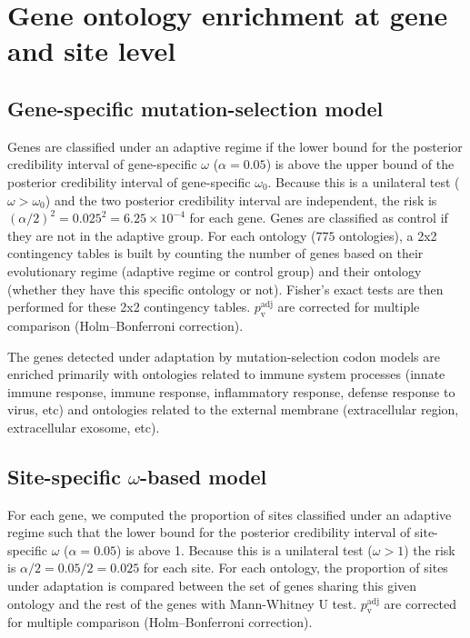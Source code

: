 \documentclass{article}
\renewcommand*{\bm}[1]{#1}%
\begin{document}
    \newpage


    \section{Gene ontology enrichment at gene and site level}
    \label{sec:gene-ontology-enrichment}

    \subsection{Gene-specific mutation-selection model}

    Genes are classified under an adaptive regime if the lower bound for the posterior credibility interval of gene-specific $\omega$ ($\alpha=0.05$) is above the upper bound of the posterior credibility interval of gene-specific $\omega_{0}$.
    Because this is a unilateral test ($\omega > \omega_{0}$) and the two posterior credibility interval are independent, the risk is $(\alpha/2)^2=0.025^2=6.25 \times 10^{-4}$ for each gene.
    Genes are classified as control if they are not in the adaptive group.
    For each ontology ($775$ ontologies), a 2x2 contingency tables is built by counting the number of genes based on their evolutionary regime (adaptive regime or control group) and their ontology (whether they have this specific ontology or not).
    Fisher's exact tests are then performed for these 2x2 contingency tables.
    $p_{\mathrm{v}}^{\mathrm{adj}}$ are corrected for multiple comparison (Holm–Bonferroni correction).

    \begin{center}
        \footnotesize
        
    \end{center}
    The genes detected under adaptation by mutation-selection codon models are enriched primarily with ontologies related to immune system processes (innate immune response, immune response, inflammatory response, defense response to virus, etc) and ontologies related to the external membrane (extracellular region, extracellular exosome, etc).

    \subsection{Site-specific $\bm{\omega}$-based model}
    \label{subsec:w-based-codon-method}
    For each gene, we computed the proportion of sites classified under an adaptive regime such that the lower bound for the posterior credibility interval of site-specific $\omega$ ($\alpha=0.05$) is above 1.
    Because this is a unilateral test ($\omega > 1$) the risk is $\alpha/2=0.05/2=0.025$ for each site.
    For each ontology, the proportion of sites under adaptation is compared between the set of genes sharing this given ontology and the rest of the genes with Mann-Whitney U test.
    $p_{\mathrm{v}}^{\mathrm{adj}}$ are corrected for multiple comparison (Holm–Bonferroni correction).
\end{document}
